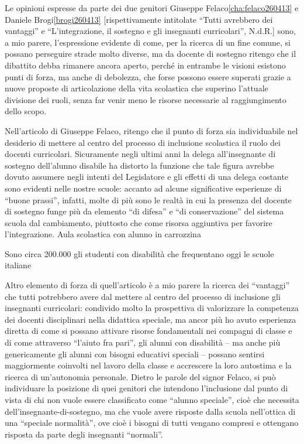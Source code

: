 Le opinioni espresse da parte dei due genitori Giuseppe Felaco\ref{cha:felaco260413} e Daniele Brogi\ref{brogi260413} [rispettivamente intitolate “Tutti avrebbero dei vantaggi” e “L'integrazione, il sostegno e gli insegnanti curricolari”, N.d.R.] sono, a mio parere, l'espressione evidente di come, per la ricerca di un fine comune, si possano perseguire strade molto diverse, ma da docente di sostegno ritengo che il dibattito debba rimanere ancora aperto, perché in entrambe le visioni esistono punti di forza, ma anche di debolezza, che forse possono essere superati grazie a nuove proposte di articolazione della vita scolastica che superino l'attuale divisione dei ruoli, senza far venir meno le risorse necessarie al raggiungimento dello scopo.

Nell'articolo di Giuseppe Felaco, ritengo che il punto di forza sia individuabile nel desiderio di mettere al centro del processo di inclusione scolastica il ruolo dei docenti curricolari. Sicuramente negli ultimi anni la delega all'insegnante di sostegno dell'alunno disabile ha distorto la funzione che tale figura avrebbe dovuto assumere negli intenti del Legislatore e gli effetti di una delega costante sono evidenti nelle nostre scuole: accanto ad alcune significative esperienze di “buone prassi”, infatti, molte di più sono le realtà in cui la presenza del docente di sostegno funge più da elemento “di difesa” e “di conservazione” del sistema scuola dal cambiamento, piuttosto che come risorsa aggiuntiva per favorire l'integrazione.
Aula scolastica con alunno in carrozzina

Sono circa 200.000 gli studenti con disabilità che frequentano oggi le scuole italiane

Altro elemento di forza di quell'articolo è a mio parere la ricerca dei “vantaggi” che tutti potrebbero avere dal mettere al centro del processo di inclusione gli insegnanti curricolari: condivido molto la prospettiva di valorizzare la competenza dei docenti disciplinari nella didattica speciale, ma ancor più ho avuto esperienza diretta di come si possano attivare risorse fondamentali nei compagni di classe e di come attraverso “l'aiuto fra pari”, gli alunni con disabilità – ma anche più genericamente gli alunni con bisogni educativi speciali – possano sentirsi maggiormente coinvolti nel lavoro della classe e accrescere la loro autostima e la ricerca di un'autonomia personale.
Dietro le parole del signor Felaco, si può individuare la posizione di quei genitori che intendono l'inclusione dal punto di vista di chi non vuole essere classificato come “alunno speciale”, cioè che necessita dell'insegnante-di-sostegno, ma che vuole avere risposte dalla scuola nell'ottica di una “speciale normalità”, ove cioè i bisogni di tutti vengano compresi e ottengano risposta da parte degli insegnanti “normali”.

